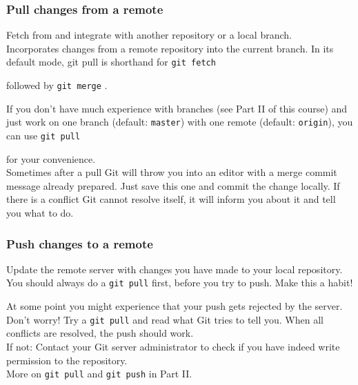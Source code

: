 \documentclass{gittalk}
\newcommand{\hlcommand}[1]{ %
\colorbox{base3}{\small \texttt{#1}}
}
\begin{document}
\begin{frame}[fragile]
\frametitle{Pull changes from a remote}
\begin{tcolorbox}[title=git pull]
Fetch from and integrate with another repository or a local 
branch.\\[0.5em]
Incorporates changes from a remote repository into the current branch. 
In its default mode, git pull is shorthand for \hlcommand{git fetch} 
followed by \hlcommand{git merge}.
\end{tcolorbox}
\vspace*{0.5em}
If you don't have much experience with branches (see Part II of this 
course) and just work on one branch (default: \texttt{master}) with 
one remote (default: \texttt{origin}), you can use \hlcommand{git pull}
for your convenience.\\[0.5em]
Sometimes after a pull Git will throw you into an editor with a merge 
commit message already prepared. Just save this one and commit the 
change locally. If there is a conflict Git cannot resolve itself, it 
will inform you about it and tell you what to do.
\end{frame}

\begin{frame}[fragile]
\frametitle{Push changes to a remote}
\begin{tcolorbox}[title=git push]
Update the remote server with changes you have made to your local 
repository.\\[0.5em]
You should always do a  \hlcommand{git pull} first, before you try to 
push. Make this a habit!
\end{tcolorbox}

At some point you might experience that your push gets rejected by the 
server. Don't worry! Try a \hlcommand{git pull} and read what Git 
tries to tell you. When all conflicts are resolved, the push should 
work.\\[0.5em]
If not: Contact your Git server administrator to check if you have 
indeed write permission to the repository.\\[0.5em]
More on \hlcommand{git pull} and \hlcommand{git push} in Part II.

\end{frame}
\end{document}

